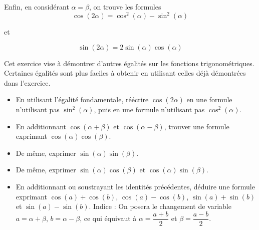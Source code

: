 Enfin, en considérant $\alpha=\beta$, on trouve les formules $$\cos(2\alpha)=\cos^2(\alpha)-\sin^2(\alpha)$$ \begin{center} et \end{center} $$\sin(2\alpha)=2\sin(\alpha)\cos(\alpha)$$

\begin{exo}
    Cet exercice vise à démontrer d'autres égalités sur les fonctions trigonométriques. Certaines égalités sont plus faciles à obtenir en utilisant celles déjà démontrées dans l'exercice.
    \begin{itemize}[label=$\bullet$]
        \item En utilisant l'égalité fondamentale, réécrire $\cos(2\alpha)$ en une formule n'utilisant pas $\sin^2(\alpha)$, puis en une formule n'utilisant pas $\cos^2(\alpha)$.
        \item En additionnant $\cos(\alpha+\beta)$ et $\cos(\alpha-\beta)$, trouver une formule exprimant $\cos(\alpha)\cos(\beta)$.
        \item De même, exprimer $\sin(\alpha)\sin(\beta)$.
        \item De même, exprimer $\sin(\alpha)\cos(\beta)$ et $\cos(\alpha)\sin(\beta)$.
        \item En additionnant ou soustrayant les identités précédentes, déduire une formule exprimant $\cos(a)+\cos(b)$, $\cos(a)-\cos(b)$, $\sin(a)+\sin(b)$ et $\sin(a)-\sin(b)$. Indice : On posera le changement de variable $a=\alpha+\beta$, $b=\alpha-\beta$, ce qui équivaut à $\alpha=\dfrac{a+b}{2}$ et $\beta=\dfrac{a-b}{2}$.
    \end{itemize}
\end{exo}

\newpage